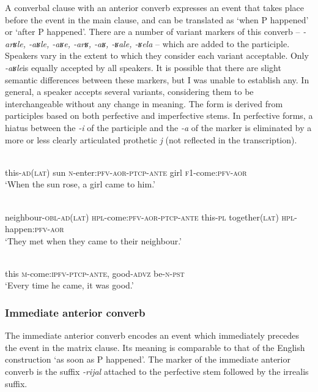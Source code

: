 ﻿\documentclass[output=paper]{langsci/langscibook}
\begin{document}
A converbal clause with an anterior converb expresses an event that
takes place before the event in the main clause, and can be translated as
`when P happened' or `after P happened'. There are a number of variant
markers of this converb – \emph{-arʁle, -aʁle, -aʁe, -arʁ, -aʁ, -ʁale,
-ʁela} – which are added to the participle. Speakers vary in the extent to
which they consider each variant acceptable. Only \emph{-aʁle}\pagebreak[4]
is equally accepted by all speakers. It is possible that there are slight
semantic differences between these markers, but I was unable to
establish any. In general, a speaker accepts several variants,
considering them to be interchangeable without any change in meaning.
The form is derived from participles based on both perfective and
imperfective stems. In perfective forms, a hiatus between the \emph{-i}
of the participle and the \emph{-a} of the marker is eliminated by a more
or less clearly articulated prothetic \emph{j} (not reflected in the
transcription).

\ea \label{ex:8:6} %
\\
this-\textsc{ad}(\textsc{lat}) sun \textsc{n}-enter:\textsc{pfv}-\textsc{aor}-\textsc{ptcp}-\textsc{ante} girl \textsc{f1}-come:\textsc{pfv}-\textsc{aor}\\
\glt `When the sun rose, a girl came to him.'

\ex \label{ex:8:7} %
\\
neighbour-\textsc{obl}-\textsc{ad}(\textsc{lat}) \textsc{hpl}-come:\textsc{pfv}-\textsc{aor}-\textsc{ptcp}-\textsc{ante} this-\textsc{pl} together(\textsc{lat}) \textsc{hpl}-happen:\textsc{pfv}-\textsc{aor}\\
\glt `They met when they came to their neighbour.'

\ex \label{ex:8:8} %
\\
this \textsc{m}-come:\textsc{ipfv}-\textsc{ptcp}-\textsc{ante}, good-\textsc{advz} {be}-\textsc{n}-\textsc{pst}\\
\glt `Every time he came, it was good.'
\z


\subsubsection{Immediate anterior converb}

The immediate anterior converb encodes an event which immediately
precedes the event in the matrix clause. Its meaning is comparable to
that of the English construction `as soon as P happened'. The marker of
the immediate anterior converb is the suffix \emph{-rijal} attached to
the perfective stem followed by the irrealis suffix.
\end{document}
